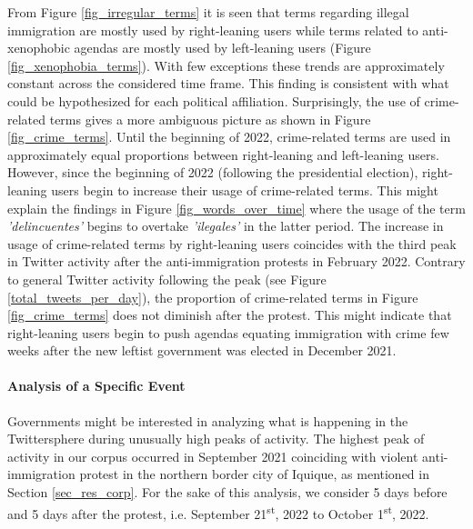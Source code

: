     From Figure \ref{fig_irregular_terms} it is seen that terms regarding illegal immigration are mostly used by right-leaning users while terms related to anti-xenophobic agendas are mostly used by left-leaning users (Figure \ref{fig_xenophobia_terms}). With few exceptions these trends are approximately constant across the considered time frame. This finding is consistent with what could be hypothesized for each political affiliation. Surprisingly, the use of crime-related terms gives a more ambiguous picture as shown in Figure \ref{fig_crime_terms}. Until the beginning of 2022, crime-related terms are used in approximately equal proportions between right-leaning and left-leaning users. However, since the beginning of 2022 (following the presidential election), right-leaning users begin to increase their usage of crime-related terms. This might explain the findings in Figure \ref{fig_words_over_time} where the usage of the term {\it 'delincuentes'} begins to overtake {\it 'ilegales'} in the latter period.  The increase in usage of crime-related terms by right-leaning users coincides with the third peak in Twitter activity after the anti-immigration protests in February 2022. Contrary to general Twitter activity following the peak (see Figure \ref{total_tweets_per_day}), the proportion of crime-related terms in Figure \ref{fig_crime_terms} does not diminish after the protest. This might indicate that right-leaning users begin to push agendas equating immigration with crime few weeks after the new leftist government was elected in December 2021.


    \paragraph{Analysis of a Specific Event}
    Governments might be interested in analyzing what is happening in the Twittersphere during unusually high peaks of activity. The highest peak of activity in our corpus occurred in September 2021 coinciding with violent anti-immigration protest in the northern border city of Iquique, as mentioned in Section \ref{sec_res_corp}. For the sake of this analysis, we consider 5 days before and 5 days after the protest, i.e. September 21\textsuperscript{st}, 2022 to October 1\textsuperscript{st}, 2022. 
    
